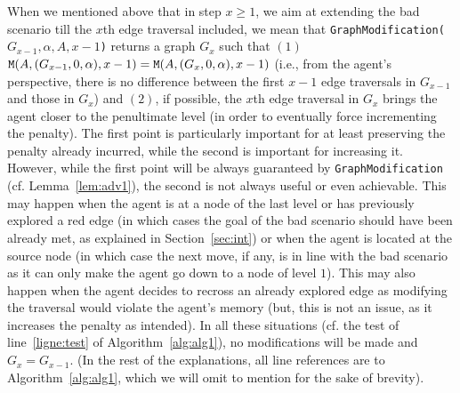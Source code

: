 \documentclass[11pt]{article}
\begin{document}
{When we mentioned above that in step $x\geq1$, we aim at extending the bad scenario till the $x$th edge traversal included, we mean that {\tt GraphModification($G_{x-1},\alpha,A,x-1$)} returns a graph $G_{x}$ such that $(1)$ ${\tt M}(A,(G_{x-1},0,\alpha),x-1)={\tt M}(A,(G_{x},0,\alpha),x-1)$ (i.e., from the agent's perspective, there is no difference between the first $x-1$ edge traversals in $G_{x-1}$ and those in $G_{x}$) and $(2)$, if possible, the $x$th edge traversal in $G_{x}$ brings the agent closer to the penultimate level (in order to eventually force incrementing the penalty). The first point is particularly important for at least preserving the penalty already incurred, while the second is important for increasing it. However, while the first point will be always guaranteed by {\tt GraphModification} (cf. Lemma~\ref{lem:adv1}), the second is not always useful or even achievable. This may happen when the agent is at a node of the last level or has previously explored a red edge (in which cases the goal of the bad scenario should have been already met, as explained in Section~\ref{sec:int}) or when the agent is located at the source node (in which case the next move, if any, is in line with the bad scenario as it can only make the agent go down to a node of level $1$). This may also happen when the agent decides to recross an already explored edge as modifying the traversal would violate the agent's memory (but, this is not an issue, as it increases the penalty as intended). In all these situations (cf. the test of line~\ref{ligne:test} of Algorithm~\ref{alg:alg1}), no modifications will be made and $G_x=G_{x-1}$. (In the rest of the explanations, all line references are to Algorithm~\ref{alg:alg1}, which we will omit to mention for the sake of brevity).




}
\end{document}
